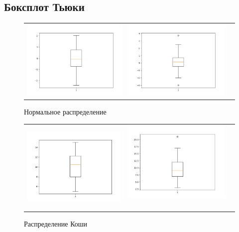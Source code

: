 \subsection{Боксплот Тьюки}
\begin{figure}[H]
	\centering
	\begin{tabular}{ccc}
		\includegraphics[width=55mm, height =0.25\textheight]{pics/n20.png}
		&
		\includegraphics[width=55mm, height =0.25\textheight]{pics/n100.png}
	\end{tabular}
	\caption{Нормальное распределение}
	\label{fig:normal}
\end{figure}

\begin{figure}[H]
	\centering
	\begin{tabular}{ccc}
		\includegraphics[width=55mm, height =0.25\textheight]{pics/c20.png}
		&
		\includegraphics[width=55mm, height =0.25\textheight]{pics/c100.png}\
	\end{tabular}
	\caption{Распределение Коши}
	\label{fig:cauchy}
\end{figure}


